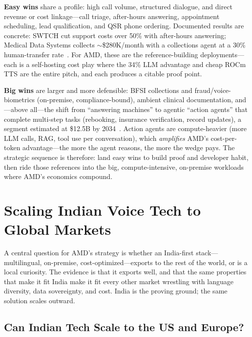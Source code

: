 \documentclass[blind]{gtac}
\begin{document}
\textbf{Easy wins} share a profile: high call volume, structured dialogue, and direct revenue or cost linkage---call triage, after-hours answering, appointment scheduling, lead qualification, and QSR phone ordering. Documented results are concrete: SWTCH cut support costs over 50\% with after-hours answering; Medical Data Systems collects $\sim$\$280K/month with a collections agent at a 30\% human-transfer rate~\cite{retell_roi}. For AMD, these are the reference-building deployments---each is a self-hosting cost play where the 34\% LLM advantage and cheap ROCm TTS are the entire pitch, and each produces a citable proof point.

\textbf{Big wins} are larger and more defensible: BFSI collections and fraud/voice-biometrics (on-premise, compliance-bound), ambient clinical documentation, and---above all---the shift from ``answering machines'' to agentic ``action agents'' that complete multi-step tasks (rebooking, insurance verification, record updates), a segment estimated at \$12.5B by 2034~\cite{telnyx_europe}. Action agents are compute-heavier (more LLM calls, RAG, tool use per conversation), which \emph{amplifies} AMD's cost-per-token advantage---the more the agent reasons, the more the wedge pays. The strategic sequence is therefore: land easy wins to build proof and developer habit, then ride those references into the big, compute-intensive, on-premise workloads where AMD's economics compound.

\section{Scaling Indian Voice Tech to Global Markets}
\label{sec:global}

A central question for AMD's strategy is whether an India-first stack---multilingual, on-premise, cost-optimized---exports to the rest of the world, or is a local curiosity. The evidence is that it exports well, and that the same properties that make it fit India make it fit every other market wrestling with language diversity, data sovereignty, and cost. India is the proving ground; the same solution scales outward.

\subsection{Can Indian Tech Scale to the US and Europe?}
\end{document}
